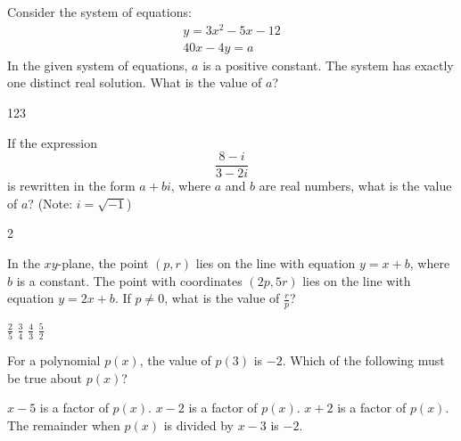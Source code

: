 \question[1]
Consider the system of equations:
\[
  \begin{gathered}
  y=3 x^2-5 x-12 \\
  40 x-4 y=a
  \end{gathered}
\]
In the given system of equations, $a$ is a positive constant. The system has exactly one distinct real solution. What is the value of $a$?
\begin{solution}
123
\end{solution}

\question[1]
If the expression
\[
\frac{8-i}{3-2 i}
\]
is rewritten in the form $a+b i$, where $a$ and $b$ are real numbers, what is the value of $a$? (Note: $i=\sqrt{-1}$)
\begin{solution}
2
\end{solution}







\newpage







\question[1]
In the $xy$-plane, the point $(p, r)$ lies on the line with equation $y = x + b$, where $b$ is a constant. The point with coordinates $(2p, 5r)$ lies on the line with equation $y = 2x + b$. If $p \neq 0$, what is the value of $\frac{r}{p}$?
\begin{choices}
  \choice $\frac{2}{5}$
  \CorrectChoice $\frac{3}{4}$
  \choice $\frac{4}{3}$
  \choice $\frac{5}{2}$
\end{choices}

\question[1]
For a polynomial $p(x)$, the value of $p(3)$ is $-2$. Which of the following must be true about $p(x)$?
\begin{choices}
  \choice $x-5$ is a factor of $p(x)$.
  \choice $x-2$ is a factor of $p(x)$.
  \choice $x+2$ is a factor of $p(x)$.
  \CorrectChoice The remainder when $p(x)$ is divided by $x-3$ is $-2$.
\end{choices}


